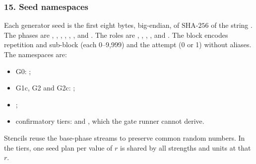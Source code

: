 \subsubsection*{15. Seed namespaces}
Each generator seed is the first eight bytes, big-endian, of $\mathrm{SHA\text{-}256}$ of the string . The phases are , , , , , ,  and . The roles are , , , ,  and . The block encodes repetition and sub-block (each 0--9,999) and the attempt (0 or 1) without aliases. The namespaces are:
\begin{itemize}
\item G0: ;
\item G1c, G2 and G2c: ;
\item {};
\item confirmatory tiers:  and , which the gate runner cannot derive.
\end{itemize}
Stencils reuse the base-phase streams to preserve common random numbers. In the tiers, one seed plan per value of $r$ is shared by all strengths and units at that $r$.


